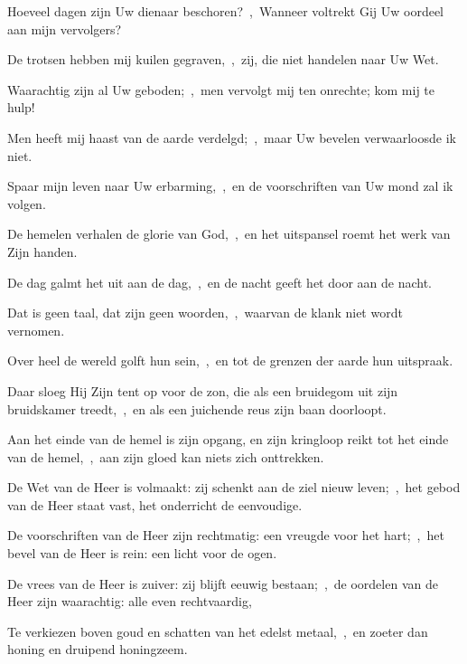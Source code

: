 \documentclass[12pt,twoside,a5paper]{article}
\begin{document}
\begin{halfparskip}
  Hoeveel dagen zijn Uw dienaar beschoren?~\sep\ Wanneer voltrekt Gij Uw oordeel aan mijn vervolgers?

  De trotsen hebben mij kuilen gegraven,~\sep\ zij, die niet handelen naar Uw Wet.

  Waarachtig zijn al Uw geboden;~\sep\ men vervolgt mij ten onrechte; kom mij te hulp!

  Men heeft mij haast van de aarde verdelgd;~\sep\ maar Uw bevelen verwaarloosde ik niet.

  Spaar mijn leven naar Uw erbarming,~\sep\ en de voorschriften van Uw mond zal ik volgen.
\end{halfparskip}

\begin{halfparskip}

   De hemelen verhalen de glorie van God,~\sep\ en het uitspansel roemt het werk van Zijn handen.


  De dag galmt het uit aan de dag,~\sep\ en de nacht geeft het door aan de nacht.

  Dat is geen taal, dat zijn geen woorden,~\sep\ waarvan de klank niet wordt vernomen.

  Over heel de wereld golft hun sein,~\sep\ en tot de grenzen der aarde hun uitspraak.

  Daar sloeg Hij Zijn tent op voor de zon, die als een bruidegom uit zijn bruidskamer treedt,~\sep\ en als een juichende reus zijn baan doorloopt.

  Aan het einde van de hemel is zijn opgang, en zijn kringloop reikt tot het einde van de hemel,~\sep\ aan zijn gloed kan niets zich onttrekken.

  De Wet van de Heer is volmaakt: zij schenkt aan de ziel nieuw leven;~\sep\ het gebod van de Heer staat vast, het onderricht de eenvoudige.

  De voorschriften van de Heer zijn rechtmatig: een vreugde voor het hart;~\sep\ het bevel van de Heer is rein: een licht voor de ogen.

  De vrees van de Heer is zuiver: zij blijft eeuwig bestaan;~\sep\ de oordelen van de Heer zijn waarachtig: alle even rechtvaardig,

  Te verkiezen boven goud en schatten van het edelst metaal,~\sep\ en zoeter dan honing en druipend honingzeem.


\end{halfparskip}
\end{document}
